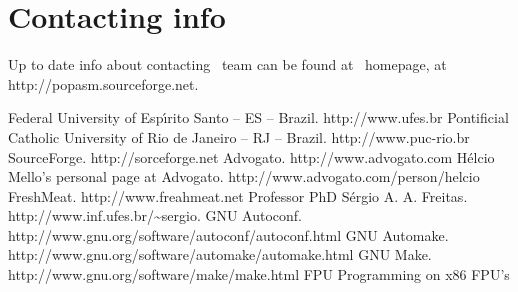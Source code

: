 \documentclass[a4paper,draft,12pt]{book}
\begin{document}
\appendix

\chapter{Contacting info\label{CONTACT}}
Up to date info about contacting \popasm\ team can be found at \popasm\ 
homepage, at http://popasm.sourceforge.net.

\begin{thebibliography}{12}
 Federal University of Esp\'{\i}rito Santo -- ES -- Brazil.
http://www.ufes.br
 Pontificial Catholic University of Rio de Janeiro -- RJ
-- Brazil. http://www.puc-rio.br
 SourceForge. http://sorceforge.net
Advogato. http://www.advogato.com
H\'elcio Mello's personal page at Advogato.
http://www.advogato.com/person/helcio
FreshMeat. http://www.freahmeat.net
Professor PhD S\'ergio A. A. Freitas.
http://www.inf.ufes.br/\~{}sergio.
GNU Autoconf.
http://www.gnu.org/software/autoconf/autoconf.html
GNU Automake.
http://www.gnu.org/software/automake/automake.html
GNU Make. http://www.gnu.org/software/make/make.html
\bibitem{FPUMAN}FPU Programming on x86 FPU's
\end{thebibliography}
\end{document}
